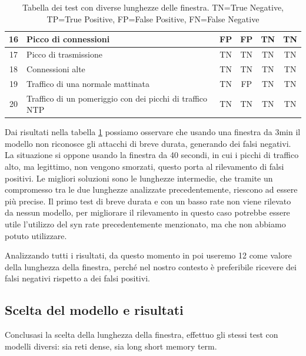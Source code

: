 \begin{table}
\begin{tabularx}{\textwidth}{||c X c c c c||}
        \hline 
        16 & Picco di connessioni & \cellcolor{orange} FP & \cellcolor{orange} FP & TN & TN\\        
        \hline
        17 & Picco di trasmissione & TN & TN & TN & TN\\        
        \hline
        18 & Connessioni alte & TN & TN & TN & TN\\
        \hline
        19 & Traffico di una normale mattinata & TN & \cellcolor{orange} FP & TN & TN\\ 
        \hline
        20 & Traffico di un pomeriggio con dei picchi di traffico NTP & TN & TN & TN & TN\\ 
        \hline
    \end{tabularx}
    \caption{Tabella dei test con diverse lunghezze delle finestra. TN=True Negative, TP=True Positive,  FP=False Positive,  FN=False Negative}
    \label{table:finestra}
\end{table}
\FloatBarrier

Dai risultati nella tabella \ref{table:finestra} possiamo osservare che usando una finestra da 3min il modello non riconosce gli attacchi di breve durata, generando dei falsi negativi. La situazione si oppone usando la finestra da 40 secondi, in cui i picchi di traffico alto, ma legittimo, non vengono smorzati, questo porta al rilevamento di falsi positivi. Le migliori soluzioni sono le lunghezze intermedie, che tramite un compromesso tra le due lunghezze analizzate precedentemente, riescono ad essere più precise.
Il primo test di breve durata e con un basso rate non viene rilevato da nessun modello, per migliorare il rilevamento in questo caso potrebbe essere utile l'utilizzo del syn rate precedentemente menzionato, ma che non abbiamo potuto utilizzare.

Analizzando tutti i risultati, da questo momento in poi useremo 12 come valore della lunghezza della finestra, perché nel nostro contesto è preferibile ricevere dei falsi negativi rispetto a dei falsi positivi.


\subsection{Scelta del modello e risultati}

Conclusasi la scelta della lunghezza della finestra, effettuo gli stessi test con modelli diversi: sia reti dense, sia long short memory term.

